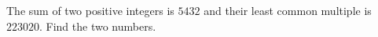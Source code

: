 The sum of two positive integers is $5432$ and their least common multiple is $223020$. Find the two numbers.

